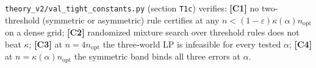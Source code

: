 \begin{remark}\label{rmk:t1c-val}
\texttt{theory\_v2/val\_tight\_constants.py} (section \texttt{T1c}) verifies:
\textbf{[C1]} no two-threshold (symmetric or asymmetric) rule certifies at any
$n<(1-\varepsilon)\kappa(\alpha)n_{\mathrm{opt}}$ on a dense grid;
\textbf{[C2]} randomized mixture search over threshold rules does not beat $\kappa$;
\textbf{[C3]} at $n=4n_{\mathrm{opt}}$ the three-world LP is infeasible for every tested $\alpha$;
\textbf{[C4]} at $n=\kappa(\alpha)n_{\mathrm{opt}}$ the symmetric band binds all three errors at
$\alpha$.
\end{remark}
